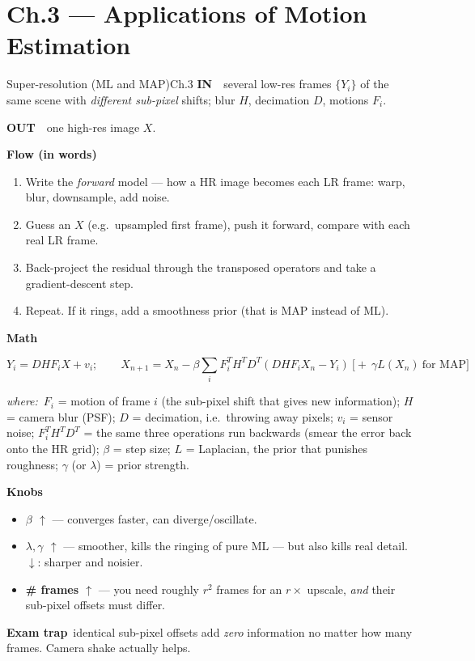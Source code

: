 \documentclass[9pt,a4paper]{extarticle}
\newcommand{\IN}{\textbf{\color{cIn}IN}\ }
\newcommand{\OUT}{\par\textbf{\color{cOut}OUT}\ }
\newcommand{\FLOW}{\par\smallskip\textbf{Flow (in words)}\par\nopagebreak}
\newcommand{\MATH}{\par\smallskip\textbf{Math}\par\nopagebreak}
\newcommand{\KNOBS}{\par\smallskip\textbf{Knobs}\par\nopagebreak}
\newcommand{\TRAP}{\par\smallskip\textbf{\color{cTrap}Exam trap}\ }
\newcommand{\WHERE}{\par\textit{where:}\ }
\newcommand{\up}{$\uparrow$}
\newcommand{\dn}{$\downarrow$}
\newcommand{\kn}[2]{\item \textbf{#1} --- #2}
\begin{document}
\section{Ch.3 --- Applications of Motion Estimation}

\begin{card}{Super-resolution (ML and MAP)}{Ch.3}
\IN\ several low-res frames $\{Y_i\}$ of the same scene with \emph{different sub-pixel} shifts; blur $H$, decimation $D$, motions $F_i$.
\OUT\ one high-res image $X$.

\FLOW
\begin{enumerate}
  \item Write the \emph{forward} model --- how a HR image becomes each LR frame: warp, blur, downsample, add noise.
  \item Guess an $X$ (e.g.\ upsampled first frame), push it forward, compare with each real LR frame.
  \item Back-project the residual through the transposed operators and take a gradient-descent step.
  \item Repeat. If it rings, add a smoothness prior (that is MAP instead of ML).
\end{enumerate}

\MATH
\[ Y_i=DHF_iX+v_i;\qquad X_{n+1}=X_n-\beta\sum_i F_i^TH^TD^T(DHF_iX_n-Y_i)\ \big[+\ \gamma L(X_n)\ \text{for MAP}\big] \]
\WHERE $F_i$ = motion of frame $i$ (the sub-pixel shift that gives new information); $H$ = camera blur (PSF); $D$ = decimation, i.e.\ throwing away pixels; $v_i$ = sensor noise; $F_i^TH^TD^T$ = the same three operations run backwards (smear the error back onto the HR grid); $\beta$ = step size; $L$ = Laplacian, the prior that punishes roughness; $\gamma$ (or $\lambda$) = prior strength.

\KNOBS
\begin{itemize}
  \kn{$\beta$ \up}{converges faster, can diverge/oscillate.}
  \kn{$\lambda,\gamma$ \up}{smoother, kills the ringing of pure ML --- but also kills real detail. \dn: sharper and noisier.}
  \kn{\# frames \up}{you need roughly $r^2$ frames for an $r\times$ upscale, \emph{and} their sub-pixel offsets must differ.}
\end{itemize}
\TRAP identical sub-pixel offsets add \emph{zero} information no matter how many frames. Camera shake actually helps.
\end{card}
\end{document}
